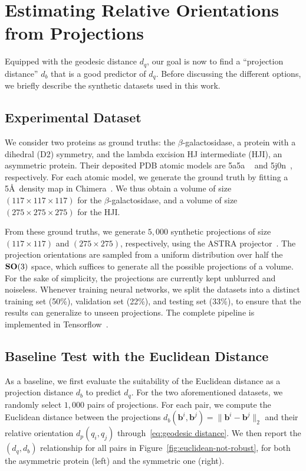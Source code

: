 \section{Estimating Relative Orientations from Projections}
\label{sec:estimating-relative-orientations}

Equipped with the geodesic distance $d_q$, our goal is now to find a ``projection distance'' $d_b$ that is a good predictor of $d_q$. Before discussing the different options, we briefly describe the synthetic datasets used in this work.

\subsection{Experimental Dataset}
\label{subsec:datasets}

We consider two proteins as ground truths: the $\beta$-galactosidase, a protein with a dihedral (D2) symmetry, and the lambda excision HJ intermediate (HJI), an asymmetric protein. Their deposited PDB atomic models are 5a5a ~\cite{bartesaghi2015betagal} and 5j0n~\cite{laxmikanthan2016structure}, respectively. For each atomic model, we generate the ground truth by fitting a 5\AA\ density map in Chimera~\cite{pettersen2004ucsf}. We thus obtain a volume of size $(117\times 117\times 117)$ for the $\beta$-galactosidase, and a volume of size $(275\times 275\times 275)$ for the HJI.

From these ground truths, we generate $5,000$ synthetic projections of size $(117\times 117)$ and $(275\times 275)$, respectively, using the ASTRA projector~\cite{van2015astra}. The projection orientations are sampled from a uniform distribution over half the $\mathrm{\mathbf{SO}}(3)$ space, which suffices to generate all the possible projections of a volume. For the sake of simplicity, the projections are currently kept unblurred and noiseless. Whenever training neural networks, we split the datasets into a distinct training set (50\%), validation set (22\%), and testing set (33\%), to ensure that the results can generalize to unseen projections. The complete pipeline is implemented in Tensorflow~\cite{abadi2016tensorflow}.


\subsection{Baseline Test with the Euclidean Distance}

As a baseline, we first evaluate the suitability of the Euclidean distance as a projection distance $d_b$ to predict $d_q$. For the two aforementioned datasets, we randomly select $1,000$ pairs of projections. For each pair, we compute the Euclidean distance between the projections $d_b(\mathbf{b}^i,\mathbf{b}^j)=\lVert\mathbf{b}^i-\mathbf{b}^j\rVert_2$ and their relative orientation $d_p(q_i,q_j)$ through~\eqref{eq:geodesic distance}. We then report the $(d_q,d_b)$ relationship for all pairs in Figure~\ref{fig:euclidean-not-robust}, for both the asymmetric protein (left) and the symmetric one (right).


